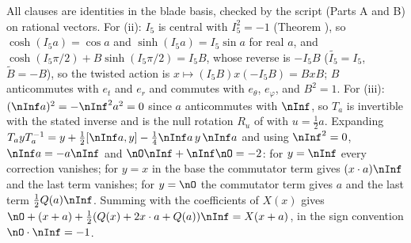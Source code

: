 All clauses are identities in the blade basis, checked by the script (Parts A and B) on rational vectors. For (ii): $I_{5}$ is central with $I_{5}^{2} = -1$ (Theorem ), so $\cosh(I_{5}a) = \cos a$ and $\sinh(I_{5}a) = I_{5}\sin a$ for real $a$, and $\cosh(I_{5}\pi/2) + B\sinh(I_{5}\pi/2) = I_{5}B$, whose reverse is $-I_{5}B$ ($\widetilde{I_{5}} = I_{5}$, $\widetilde{B} = -B$), so the twisted action is $x \mapsto (I_{5}B)x(-I_{5}B) = BxB$; $B$ anticommutes with $e_{t}$ and $e_{r}$ and commutes with $e_{\theta}$, $e_{\varphi}$, and $B^{2} = 1$. For (iii): $(\nInf a)^{2} = -\nInf^{2}a^{2} = 0$ since $a$ anticommutes with $\nInf$, so $T_{a}$ is invertible with the stated inverse and is the null rotation $R_{u}$ of  with $u = \tfrac12 a$. Expanding $T_{a}yT_{a}^{-1} = y + \tfrac12[\nInf a, y] - \tfrac14\nInf a\,y\,\nInf a$ and using $\nInf^{2} = 0$, $\nInf a = -a\nInf$ and $\nO\nInf + \nInf\nO = -2$: for $y = \nInf$ every correction vanishes; for $y = x$ in the base the commutator term gives $(x \cdot a)\nInf$ and the last term vanishes; for $y = \nO$ the commutator term gives $a$ and the last term $\tfrac12 Q(a)\nInf$. Summing with the coefficients of $X(x)$ gives $\nO + (x + a) + \tfrac12(Q(x) + 2x\cdot a + Q(a))\nInf = X(x + a)$, in the sign convention $\nO \cdot \nInf = -1$.
